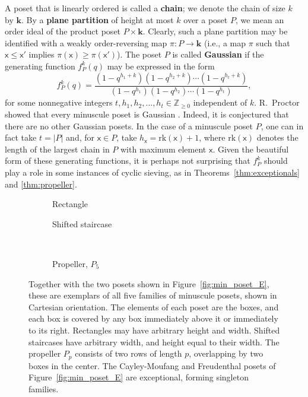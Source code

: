 \documentclass[12pt]{amsart}
\newcommand{\x}{\ensuremath{\mathsf{x}}}
\theoremstyle{definition}
\theoremstyle{remark}
\numberwithin{equation}{section}
\newcommand{\rank}{\ensuremath{\mathrm{rk}}}
\begin{document}
A poset that is linearly ordered is called a {\bf chain}; we denote the chain of size $k$ by $\mathbf{k}$. By a {\bf plane partition} of height at most $k$ over a poset $P$, we mean an order ideal of the product poset $P \times \mathbf{k}$.  Clearly, such a plane partition may be identified with a weakly order-reversing map $\pi : P \to \mathbf{k}$ (i.e., a map $\pi$ such that $\x \leq \x'$ implies $\pi(\x) \geq \pi(\x')$). The poset $P$ is called {\bf Gaussian} if the generating function $f_P^k(q)$ may be expressed in the form
\[
f_P^k(q) = \frac{(1 - q^{h_1 + k})(1 - q^{h_2 + k})\cdots(1 - q^{h_t + k})}{(1 - q^{h_1})(1 - q^{h_2})\cdots(1 - q^{h_t})},
\]
for some nonnegative integers $t, h_1, h_2, \dots, h_t \in \mathbb{Z}_{\geq 0}$ independent of $k$.
R.~Proctor showed that every minuscule poset is Gaussian \cite{Proctor}. Indeed, it is conjectured that there are no other Gaussian posets. In the case of a minuscule poset $P$, one can in fact take $t = |P|$ and, for $\x \in P$, take $h_\x = \rank(\x) + 1$, where $\rank(\x)$ denotes the length of the largest chain in $P$ with maximum element $\x$. Given the beautiful form of these generating functions, it is perhaps not surprising that $f_P^k$ should play a role in some instances of cyclic sieving, as in Theorems~\ref{thm:exceptionals} and \ref{thm:propeller}. 

\begin{figure}[h]
	\begin{subfigure}[b]{0.27\textwidth}
		\centering
		\caption{Rectangle}
	\end{subfigure}
	\hspace{2cm}
	\begin{subfigure}[b]{0.27\textwidth}
		\centering
		\caption{Shifted staircase}
	\end{subfigure} \\
	\vspace{3mm}
	\begin{subfigure}[b]{0.27\textwidth}
		\centering
		\caption{Propeller, $P_5$}
	\end{subfigure}
\caption{Together with the two posets shown in Figure~\ref{fig:min_poset_E}, these are exemplars of all five families of minuscule posets, shown in Cartesian orientation. The elements of each poset are the boxes, and each box is covered by any box immediately above it or immediately to its right. Rectangles may have arbitrary height and width. Shifted staircases have arbitrary width, and height equal to their width. The propeller $P_p$ consists of two rows of length $p$, overlapping by two boxes in the center. The Cayley-Moufang and Freudenthal posets of Figure~\ref{fig:min_poset_E} are exceptional, forming singleton families.}\label{fig:min_poset}
\end{figure}
\end{document}
